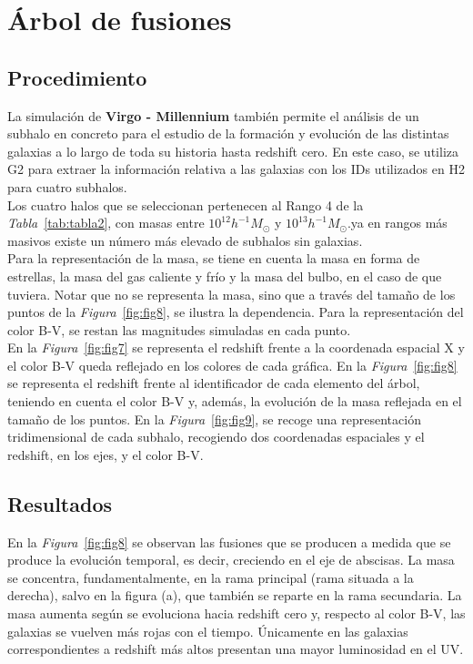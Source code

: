 \section{Árbol de fusiones} 
\label{sec:3} %

\subsection{Procedimiento}
\label{subsec:3_A}

La simulación de \textbf{Virgo - Millennium}\cite{6} también permite el análisis de un subhalo en concreto para el estudio de la formación y evolución de las distintas galaxias a lo largo de toda su historia hasta redshift cero. En este caso, se utiliza G2 para extraer la información relativa a las galaxias con los IDs utilizados en H2 para cuatro subhalos. \\

Los cuatro halos que se seleccionan pertenecen al Rango 4 de la \textit{Tabla}~\ref{tab:tabla2}, con masas entre $10^{12}h^{-1}M_{\odot}$ y $10^{13}h^{-1}M_{\odot}$.ya en rangos más masivos existe un número más elevado de subhalos sin galaxias. \\

Para la representación de la masa, se tiene en cuenta la masa en forma de estrellas, la masa del gas caliente y frío y la masa del bulbo, en el caso de que tuviera. Notar que no se representa la masa, sino que a través del tamaño de los puntos de la \textit{Figura}~\ref{fig:fig8}, se ilustra la dependencia. Para la representación del color B-V, se restan las magnitudes simuladas en cada punto. \\

En la \textit{Figura}~\ref{fig:fig7} se representa el redshift frente a la coordenada espacial X y el color B-V queda reflejado en los colores de cada gráfica. En la \textit{Figura}~\ref{fig:fig8} se representa el redshift frente al identificador de cada elemento del árbol, teniendo en cuenta el color B-V y, además, la evolución de la masa reflejada en el tamaño de los puntos. En la \textit{Figura}~\ref{fig:fig9}, se recoge una representación tridimensional de cada subhalo, recogiendo dos coordenadas espaciales y el redshift, en los ejes, y el color B-V. \\

\subsection{Resultados}
\label{subsec:3_B}

En la \textit{Figura}~\ref{fig:fig8} se observan las fusiones que se producen a medida que se produce la evolución temporal, es decir, creciendo en el eje de abscisas. La masa se concentra, fundamentalmente, en la rama principal (rama situada a la derecha), salvo en la figura (a), que también se reparte en la rama secundaria. La masa aumenta según se evoluciona hacia redshift cero y, respecto al color B-V, las galaxias se vuelven más rojas con el tiempo. Únicamente en las galaxias correspondientes a redshift más altos presentan una mayor luminosidad en el UV. \\




